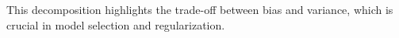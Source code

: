 \documentclass{tufte-handout}
\begin{document}

This decomposition highlights the trade-off between bias and variance, which is crucial in model selection and regularization.
\end{document}
